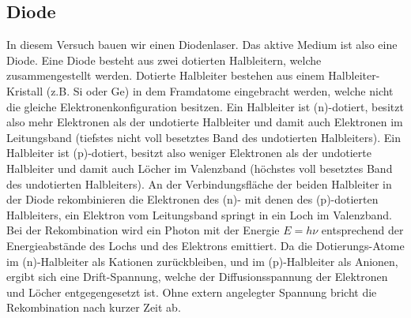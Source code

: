 \documentclass[a4paper,10pt]{scrartcl} %
\begin{document}
\subsection{Diode}
In diesem Versuch bauen wir einen Diodenlaser. Das aktive Medium ist also eine Diode. Eine Diode besteht aus zwei dotierten Halbleitern, welche zusammengestellt werden. Dotierte Halbleiter bestehen aus einem Halbleiter-Kristall (z.B. Si oder Ge) in dem Framdatome eingebracht werden, welche nicht die gleiche Elektronenkonfiguration besitzen. Ein Halbleiter ist (n)-dotiert, besitzt also mehr Elektronen als der undotierte Halbleiter und damit auch Elektronen im Leitungsband (tiefstes nicht voll besetztes Band des undotierten Halbleiters). Ein Halbleiter ist (p)-dotiert, besitzt also weniger Elektronen als der undotierte Halbleiter und damit auch Löcher im Valenzband (höchstes voll besetztes Band des undotierten Halbleiters). An der Verbindungsfläche der beiden Halbleiter in der Diode rekombinieren die Elektronen des (n)- mit denen des (p)-dotierten Halbleiters, ein Elektron vom Leitungsband springt in ein Loch im Valenzband. Bei der Rekombination wird ein Photon mit der Energie $E = h \nu$ entsprechend der Energieabstände des Lochs und des Elektrons emittiert. Da die Dotierungs-Atome im (n)-Halbleiter als Kationen zurückbleiben, und im (p)-Halbleiter als Anionen, ergibt sich eine Drift-Spannung, welche der Diffusionsspannung der Elektronen und Löcher entgegengesetzt ist. Ohne extern angelegter Spannung bricht die Rekombination nach kurzer Zeit ab.\\
\end{document}
